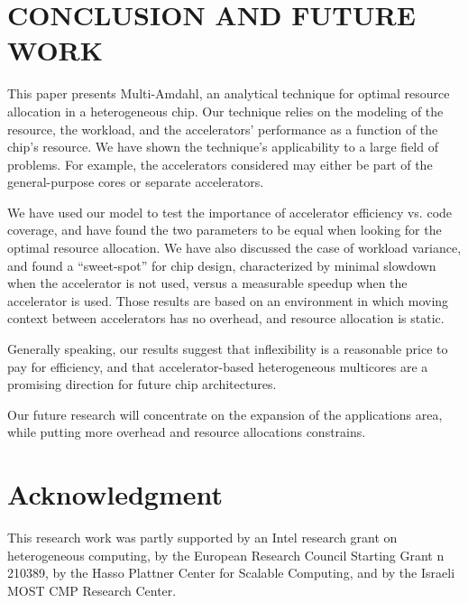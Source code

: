 \documentclass[twocolumn,english]{IEEEtran}
\begin{document}
\textbf{}




\section{CONCLUSION AND FUTURE WORK }

This paper presents Multi-Amdahl, an analytical technique for optimal
resource allocation in a heterogeneous chip. Our technique relies
on the modeling of the resource, the workload, and the accelerators\textquoteright{}
performance as a function of the chip\textquoteright{}s resource.
We have shown the technique's applicability to a large field of problems.
For example, the accelerators considered may either be part of the
general-purpose cores or separate accelerators. 

We have used our model to test the importance of accelerator efficiency
vs. code coverage, and have found the two parameters to be equal when
looking for the optimal resource allocation. We have also discussed
the case of workload variance, and found a {}``sweet-spot'' for
chip design, characterized by minimal slowdown when the accelerator
is not used, versus a measurable speedup when the accelerator is used.
Those results are based on an environment in which moving context
between accelerators has no overhead, and resource allocation is static. 

Generally speaking, our results suggest that inflexibility is a reasonable
price to pay for efficiency, and that accelerator-based heterogeneous
multicores are a promising direction for future chip architectures.

Our future research will concentrate on the expansion of the applications
area, while putting more overhead and resource allocations constrains. 


\section*{Acknowledgment}

This research work was partly supported by an Intel research grant
on heterogeneous computing, by the European Research Council Starting
Grant n 210389, by the Hasso Plattner Center for Scalable
Computing, and by the Israeli MOST CMP Research Center. 


\end{document}
